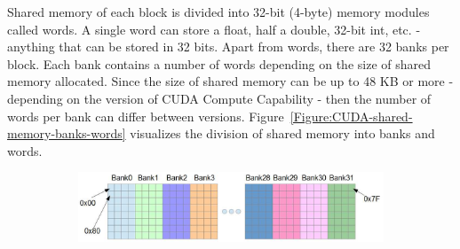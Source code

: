 Shared memory of each block is divided into 32-bit (4-byte) memory modules called words. A single word can store a float, half a double, 32-bit int, etc. - anything that can be stored in 32 bits. Apart from words, there are 32 banks per block. Each bank contains a number of words depending on the size of shared memory allocated. Since the size of shared memory can be up to 48 KB or more - depending on the version of CUDA Compute Capability - then the number of words per bank can differ between versions. Figure~\ref{Figure:CUDA-shared-memory-banks-words} visualizes the division of shared memory into banks and words.

\begin{figure}[h!]
	\centering
	\begin{subfigure}{\textwidth}
		\centering
		\includegraphics[width=14.5cm, keepaspectratio]{images/ch1/CUDA_shared_memory_banks_words.png}
		\label{Figure:CUDA-shared-memory-banks-words-bytes}
	\end{subfigure}


\end{figure}
